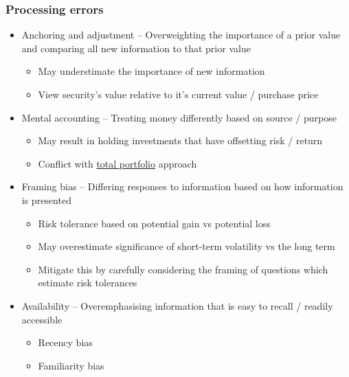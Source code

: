 \documentclass[../notes_compiled.tex]{subfiles}
\begin{document}
\begin{itemize}
\subsubsection*{Processing errors}
\begin{itemize}
\item Anchoring and adjustment -- Overweighting the importance of a prior value and comparing all new information to that prior value
\begin{itemize}
\item May understimate the importance of new information
\item View security’s value relative to it’s current value / purchase price
\end{itemize}
\item Mental accounting -- Treating money differently based on source / purpose
\begin{itemize}
\item May result in holding investments that have offsetting risk / return
\item Conflict with \underline{total portfolio} approach
\end{itemize}
\item Framing bias -- Differing responses to information based on how information is presented
\begin{itemize}
\item Risk tolerance based on potential gain vs potential loss
\item May overestimate significance of short-term volatility vs the long term
\item[] Mitigate this by carefully considering the framing of questions which estimate risk tolerances
\end{itemize}
\item Availability -- Overemphasising information that is easy to recall / readily accessible
\begin{multicols}{2}
\begin{itemize}
\item Recency bias
\item Familiarity bias
\end{itemize}
\end{multicols}
\end{itemize}

\end{itemize}
\end{document}
